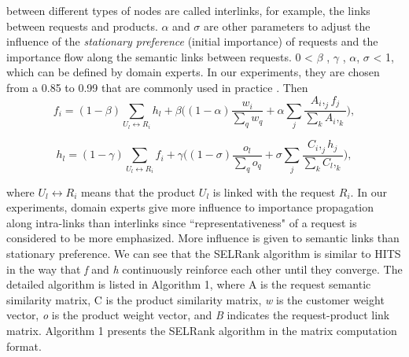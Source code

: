 \documentclass[sigconf]{acmart}
\begin{document}
between different types of nodes are called interlinks, for example, the links between requests and products. $\alpha$ and $\sigma$ are other parameters to adjust the influence of the \textit{stationary preference} (initial importance)\cite{Baeza-Yates:2006:GPD:1148170.1148225} of requests and the importance flow along the semantic links between requests. 0 < $\beta$ , $\gamma$ , $\alpha$, $\sigma$ < 1, which can be defined by domain experts. In our experiments, they are chosen from a 0.85 to 0.99 that are commonly used in practice \cite{Kamvar:2003:EMA:775152.775190}. Then $$f_i = (1 - \beta) \sum_{U_l \leftrightarrow R_i} h_l + \beta \Bigg( (1-\alpha) \frac{w_i}{\sum_q w_q} + \alpha \sum_{j} \frac{A_i,_jf_j}{\sum_kA_i,_k} \Bigg), $$

$$h_l = (1 - \gamma) \sum_{U_l \leftrightarrow R_i} f_i + \gamma \Bigg( (1-\sigma) \frac{o_l}{\sum_q o_q} + \sigma \sum_{j} \frac{C_i,_jh_j}{\sum_kC_l,_k} \Bigg), $$ 

where $U_l \leftrightarrow R_i$ means that the product $U_l$ is linked with the request $R_i$. In our experiments, domain experts give more influence to importance propagation along intra-links than interlinks since ``representativeness" of a request is considered to be more emphasized. More influence is given to semantic links than stationary preference. We can see that the SELRank algorithm is similar to HITS \cite{Kleinberg:1999:ASH:324133.324140} in the way that \textit{f} and \textit{h} continuously reinforce each other until they converge. The detailed algorithm is listed in Algorithm 1, where A is the request semantic similarity matrix, C is the product similarity matrix, \textit{w} is the customer weight vector, \textit{o} is the product weight vector, and \textit{B} indicates the request-product link matrix. Algorithm 1 presents the SELRank algorithm in the matrix computation format. 
\end{document}
